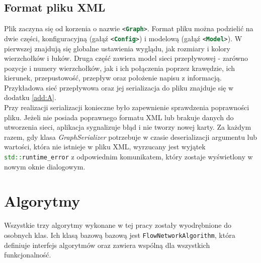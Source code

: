 \subsection{Format pliku XML}
Plik zaczyna się od korzenia o nazwie \lstinline[language=XML]|<Graph>|. Format pliku można podzielić na dwie części, konfiguracyjną (gałąź \lstinline[language=XML]|<Config>|) i modelową (gałąź \lstinline[language=XML]|<Model>|). W pierwszej znajdują się globalne ustawienia wyglądu, jak rozmiary i kolory wierzchołków i łuków. Druga część zawiera model sieci przepływowej - zarówno pozycje i numery wierzchołków, jak i ich połączenia poprzez krawędzie, ich kierunek, przepustowość, przepływ oraz położenie napisu z informacją. Przykładowa sieć przepływowa oraz jej serializacja do pliku znajduje się w dodatku \ref{add:A}.\\\indent
Przy realizacji serializacji konieczne było zapewnienie sprawdzenia poprawności pliku. Jeżeli nie posiada poprawnego formatu XML lub brakuje danych do utworzenia sieci, aplikacja sygnalizuje błąd i nie tworzy nowej karty. Za każdym razem, gdy klasa \emph{GraphSerializer} potrzebuje w czasie deserializacji argumentu lub wartości, która nie istnieje w pliku XML, wyrzucany jest wyjątek \lstinline[language=c++]|std::runtime_error| z odpowiednim komunikatem, który zostaje wyświetlony w nowym oknie dialogowym.


\section{Algorytmy}
Wszystkie trzy algorytmy wykonane w tej pracy zostały wyodrębnione do osobnych klas. Ich klasą bazową bazową jest \lstinline|FlowNetworkAlgorithm|, która definiuje interfejs algorytmów oraz zawiera wspólną dla wszystkich funkcjonalność.
